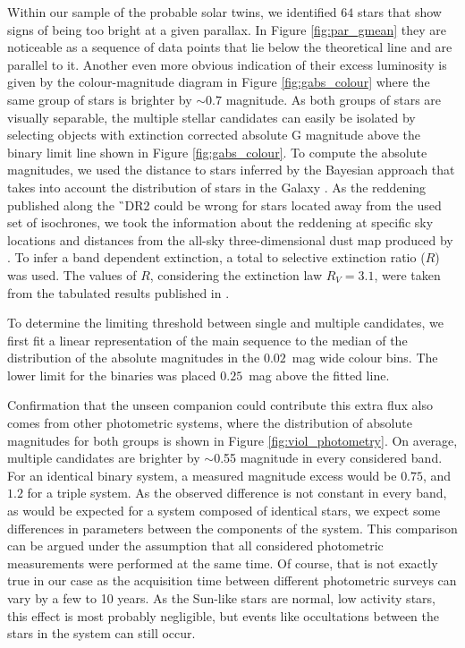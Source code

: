 Within our sample of the probable solar twins, we identified $64$ stars that show signs of being too bright at a given parallax. In Figure \ref{fig:par_gmean} they are noticeable as a sequence of data points that lie below the theoretical line and are parallel to it. Another even more obvious indication of their excess luminosity is given by the colour-magnitude diagram in Figure \ref{fig:gabs_colour} where the same group of stars is brighter by $\sim0.7$ magnitude. As both groups of stars are visually separable, the multiple stellar candidates can easily be isolated by selecting objects with extinction corrected absolute G magnitude above the binary limit line shown in Figure \ref{fig:gabs_colour}. To compute the absolute magnitudes, we used the distance to stars inferred by the Bayesian approach that takes into account the distribution of stars in the Galaxy \cite{2018AJ....156...58B}. As the reddening published along the \G\ DR2 \cite{2018A&A...616A...8A} could be wrong for stars located away from the used set of isochrones, we took the information about the reddening at specific sky locations and distances from the all-sky three-dimensional dust map produced by \citet{2017A&A...606A..65C}. To infer a band dependent extinction, a total to selective extinction ratio ($R$) was used. The values of $R$, considering the extinction law $R_V = 3.1$, were taken from the tabulated results published in \citet{2011ApJ...737..103S}.

To determine the limiting threshold between single and multiple candidates, we first fit a linear representation of the main sequence to the median of the distribution of the absolute magnitudes in the $0.02$~mag wide colour bins. The lower limit for the binaries was placed $0.25$~mag above the fitted line.

Confirmation that the unseen companion could contribute this extra flux also comes from other photometric systems, where the distribution of absolute magnitudes for both groups is shown in Figure \ref{fig:viol_photometry}. On average, multiple candidates are brighter by $\sim$0.55 magnitude in every considered band. For an identical binary system, a measured magnitude excess would be $0.75$, and $1.2$ for a triple system. As the observed difference is not constant in every band, as would be expected for a system composed of identical stars, we expect some differences in parameters between the components of the system. This comparison can be argued under the assumption that all considered photometric measurements were performed at the same time. Of course, that is not exactly true in our case as the acquisition time between different photometric surveys can vary by a few to 10 years. As the Sun-like stars are normal, low activity stars, this effect is most probably negligible, but events like occultations between the stars in the system can still occur.

